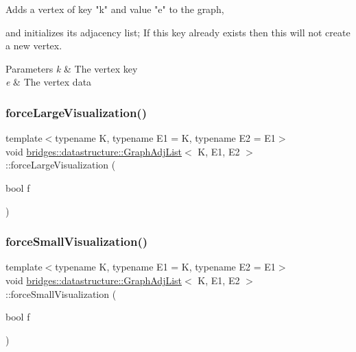 \begin{DoxyVerb}Adds a vertex of key "k" and value "e" to the graph,
\end{DoxyVerb}
 and initializes its adjacency list; If this key already exists then this will not create a new vertex.


\begin{DoxyParams}{Parameters}
{\em k} & The vertex key \\
\hline
{\em e} & The vertex data \\
\hline
\end{DoxyParams}
\mbox{\label{classbridges_1_1datastructure_1_1_graph_adj_list_a6860a0a153fd126ebe8b1bc40d2753a7}} 
\subsubsection{\texorpdfstring{forceLargeVisualization()}{forceLargeVisualization()}}
{\footnotesize\ttfamily template$<$typename K, typename E1 = K, typename E2 = E1$>$ \\
void \mbox{\hyperlink{classbridges_1_1datastructure_1_1_graph_adj_list}{bridges\+::datastructure\+::\+Graph\+Adj\+List}}$<$ K, E1, E2 $>$\+::force\+Large\+Visualization (\begin{DoxyParamCaption}\item[{bool}]{f }\end{DoxyParamCaption})\hspace{0.3cm}{\ttfamily [inline]}}

\mbox{\label{classbridges_1_1datastructure_1_1_graph_adj_list_a9706e3df7d30320b7e7773a6423e4ff7}} 
\subsubsection{\texorpdfstring{forceSmallVisualization()}{forceSmallVisualization()}}
{\footnotesize\ttfamily template$<$typename K, typename E1 = K, typename E2 = E1$>$ \\
void \mbox{\hyperlink{classbridges_1_1datastructure_1_1_graph_adj_list}{bridges\+::datastructure\+::\+Graph\+Adj\+List}}$<$ K, E1, E2 $>$\+::force\+Small\+Visualization (\begin{DoxyParamCaption}\item[{bool}]{f }\end{DoxyParamCaption})\hspace{0.3cm}{\ttfamily [inline]}}

